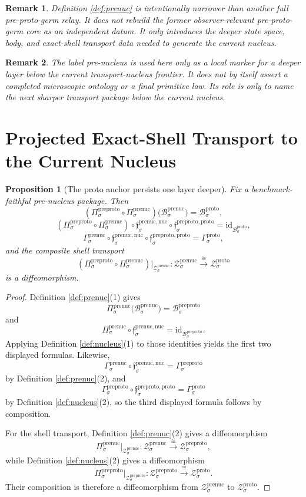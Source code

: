 \documentclass[11pt]{article}
\newcommand{\ProtoBody}[1]{\mathcal B_{#1}^{\mathrm{proto}}}
\newcommand{\ProtoSection}[1]{\Gamma_{#1}^{\mathrm{proto}}}
\newcommand{\ProtoShellSet}[1]{\mathcal Z_{#1}^{\mathrm{proto}}}
\newcommand{\PreProtoBody}[1]{\mathcal B_{#1}^{\mathrm{preproto}}}
\newcommand{\PreProtoProj}[1]{\Pi_{#1}^{\mathrm{preproto}}}
\newcommand{\PreProtoProtoMin}[1]{\mathfrak f_{#1}^{\mathrm{preproto,proto}}}
\newcommand{\PreProtoSection}[1]{\Gamma_{#1}^{\mathrm{preproto}}}
\newcommand{\PreProtoShellSet}[1]{\mathcal Z_{#1}^{\mathrm{preproto}}}
\newcommand{\PreNucBody}[1]{\mathcal B_{#1}^{\mathrm{prenuc}}}
\newcommand{\PreNucProj}[1]{\Pi_{#1}^{\mathrm{prenuc}}}
\newcommand{\PreNucNucleusMin}[1]{\mathfrak f_{#1}^{\mathrm{prenuc,nuc}}}
\newcommand{\PreNucSection}[1]{\Gamma_{#1}^{\mathrm{prenuc}}}
\newcommand{\PreNucShellSet}[1]{\mathcal Z_{#1}^{\mathrm{prenuc}}}
\newtheorem{proposition}{Proposition}
\newtheorem{remark}{Remark}
\begin{document}
\begin{remark}
Definition \ref{def:prenuc} is intentionally narrower than another full pre-proto-germ relay. It does not rebuild the former observer-relevant pre-proto-germ core as an independent datum. It only introduces the deeper state space, body, and exact-shell transport data needed to generate the current nucleus.
\end{remark}

\begin{remark}
The label \emph{pre-nucleus} is used here only as a local marker for a deeper layer below the current transport-nucleus frontier. It does not by itself assert a completed microscopic ontology or a final primitive law. Its role is only to name the next sharper transport package below the current nucleus.
\end{remark}

\section{Projected Exact-Shell Transport to the Current Nucleus}

\begin{proposition}[The proto anchor persists one layer deeper]
\label{prop:anchor}
Fix a benchmark-faithful pre-nucleus package. Then
\[
(\PreProtoProj{\sigma}\circ\PreNucProj{\sigma})\bigl(\PreNucBody{\sigma}\bigr)
=
\ProtoBody{\sigma},
\]
\[
(\PreProtoProj{\sigma}\circ\PreNucProj{\sigma})\circ
\PreNucNucleusMin{\sigma}\circ\PreProtoProtoMin{\sigma}
=
\mathrm{id}_{\ProtoBody{\sigma}},
\]
\[
\PreNucSection{\sigma}\circ\PreNucNucleusMin{\sigma}\circ\PreProtoProtoMin{\sigma}
=
\ProtoSection{\sigma},
\]
and the composite shell transport
\[
(\PreProtoProj{\sigma}\circ\PreNucProj{\sigma})\big|_{\PreNucShellSet{\sigma}}
:
\PreNucShellSet{\sigma}
\xrightarrow{\cong}
\ProtoShellSet{\sigma}
\]
is a diffeomorphism.
\end{proposition}

\begin{proof}
Definition \ref{def:prenuc}(1) gives
\[
\PreNucProj{\sigma}\bigl(\PreNucBody{\sigma}\bigr)=\PreProtoBody{\sigma}
\]
and
\[
\PreNucProj{\sigma}\circ\PreNucNucleusMin{\sigma}
=
\mathrm{id}_{\PreProtoBody{\sigma}}.
\]
Applying Definition \ref{def:nucleus}(1) to those identities yields the first two displayed formulas. Likewise,
\[
\PreNucSection{\sigma}\circ\PreNucNucleusMin{\sigma}
=
\PreProtoSection{\sigma}
\]
by Definition \ref{def:prenuc}(2), and
\[
\PreProtoSection{\sigma}\circ\PreProtoProtoMin{\sigma}
=
\ProtoSection{\sigma}
\]
by Definition \ref{def:nucleus}(2), so the third displayed formula follows by composition.

For the shell transport, Definition \ref{def:prenuc}(2) gives a diffeomorphism
\[
\PreNucProj{\sigma}\big|_{\PreNucShellSet{\sigma}}
:
\PreNucShellSet{\sigma}
\xrightarrow{\cong}
\PreProtoShellSet{\sigma},
\]
while Definition \ref{def:nucleus}(2) gives a diffeomorphism
\[
\PreProtoProj{\sigma}\big|_{\PreProtoShellSet{\sigma}}
:
\PreProtoShellSet{\sigma}
\xrightarrow{\cong}
\ProtoShellSet{\sigma}.
\]
Their composition is therefore a diffeomorphism from \(\PreNucShellSet{\sigma}\) to \(\ProtoShellSet{\sigma}\).
\end{proof}
\end{document}
